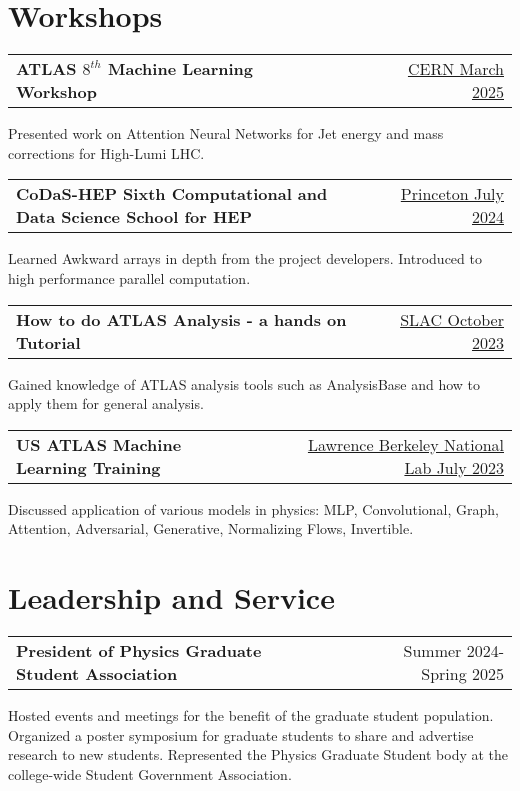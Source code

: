 \documentclass[a4paper,12pt]{article}
\makeatletter
\newenvironment{jobshort}[2]
    {
    \begin{tabularx}{\linewidth}{@{}l X r@{}}
    \textbf{#1} & \hfill &  #2 \\[3.75pt]
    \end{tabularx}
    }
    {
    }
\makeatother
\begin{document}
\section{Workshops}
\begin{jobshort}{ATLAS $8^{th}$ Machine Learning Workshop}{\href{https://indico.cern.ch/event/1488957/}{CERN March 2025}}
Presented work on Attention Neural Networks for Jet energy and mass corrections for High-Lumi LHC.
\end{jobshort}

\begin{jobshort}{CoDaS-HEP Sixth Computational and Data Science School for HEP}{\href{https://indico.cern.ch/event/1422680/}{Princeton July 2024}}
Learned Awkward arrays in depth from the project developers. Introduced to high performance parallel computation.
\end{jobshort}

\begin{jobshort}{How to do ATLAS Analysis - a hands on Tutorial}{\href{https://indico.cern.ch/event/1309794/}{SLAC October 2023}}
Gained knowledge of ATLAS analysis tools such as AnalysisBase and how to apply them for general analysis.
\end{jobshort}

\begin{jobshort}{US ATLAS Machine Learning Training}{\href{https://indico.cern.ch/event/1264566/}{Lawrence Berkeley National Lab July 2023}}
Discussed application of various models in physics: MLP, Convolutional, Graph, Attention, Adversarial, Generative, Normalizing Flows, Invertible.
\end{jobshort}

\section{Leadership and Service}
\begin{jobshort}{President of Physics Graduate Student Association}{Summer 2024-Spring 2025}
Hosted events and meetings for the benefit of the graduate student population. Organized a poster symposium for graduate students to share and advertise research to new students. Represented the Physics Graduate Student body at the college-wide Student Government Association.
\end{jobshort}
\end{document}
